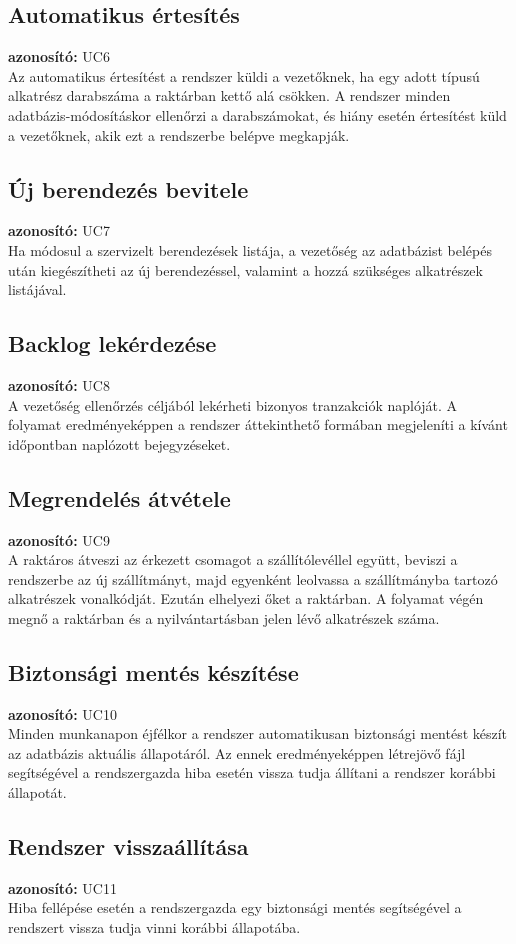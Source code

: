 \documentclass[12pt]{article}\usepackage[left=20mm,right=20mm,top=15mm,bottom=20mm]{geometry}
\begin{document}
\subsection{Automatikus értesítés}
\textbf{azonosító: } UC6 \\
Az automatikus értesítést a rendszer küldi a vezetőknek, ha egy adott típusú alkatrész darabszáma a raktárban kettő alá csökken.
A rendszer minden adatbázis-módosításkor ellenőrzi a darabszámokat, és hiány esetén értesítést küld a vezetőknek, akik ezt a rendszerbe belépve megkapják.

\subsection{Új berendezés bevitele}
\textbf{azonosító: } UC7 \\
Ha módosul a szervizelt berendezések listája, a vezetőség az adatbázist belépés után kiegészítheti az új berendezéssel, valamint a hozzá szükséges alkatrészek listájával.

\subsection{Backlog lekérdezése}
\textbf{azonosító: } UC8 \\
A vezetőség ellenőrzés céljából lekérheti bizonyos tranzakciók naplóját. 
A folyamat eredményeképpen a rendszer áttekinthető formában megjeleníti a kívánt időpontban naplózott bejegyzéseket.

\subsection{Megrendelés átvétele}
\textbf{azonosító: } UC9 \\
A raktáros átveszi az érkezett csomagot a szállítólevéllel együtt, beviszi a rendszerbe az új szállítmányt, majd egyenként leolvassa a szállítmányba tartozó alkatrészek vonalkódját.
Ezután elhelyezi őket a raktárban.
A folyamat végén megnő a raktárban és a nyilvántartásban jelen lévő alkatrészek száma.

\subsection{Biztonsági mentés készítése}
\textbf{azonosító: } UC10 \\
Minden munkanapon éjfélkor a rendszer automatikusan biztonsági mentést készít az adatbázis aktuális állapotáról.
Az ennek eredményeképpen létrejövő fájl segítségével a rendszergazda hiba esetén vissza tudja állítani a rendszer korábbi állapotát.

\subsection{Rendszer visszaállítása}
\textbf{azonosító: } UC11 \\
Hiba fellépése esetén a rendszergazda egy biztonsági mentés segítségével a rendszert vissza tudja vinni korábbi állapotába.
\end{document}
